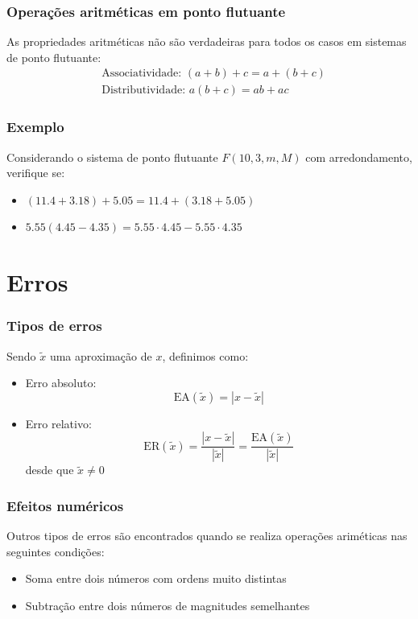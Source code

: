 \documentclass{beamer}
\begin{document}
\begin{frame}
	\frametitle{Operações aritméticas em ponto flutuante}
	As propriedades aritméticas não são verdadeiras para todos os casos em sistemas de ponto flutuante:
	\begin{equation*}
		\begin{aligned}
			&\mbox{Associatividade: } (a + b) + c = a + (b + c)\\
			&\mbox{Distributividade: } a (b + c) = ab + ac		
		\end{aligned}
	\end{equation*}
\end{frame}

\begin{frame}
	\frametitle{Exemplo}
	Considerando o sistema de ponto flutuante $ F(10, 3, m, M) $ com arredondamento, verifique se:
	\begin{itemize}
		\item $ (11.4 + 3.18) + 5.05 = 11.4 + (3.18 + 5.05) $
		\item $ 5.55(4.45 - 4.35) = 5.55\cdot 4.45 - 5.55\cdot4.35$
	\end{itemize}
\end{frame}

\section{Erros}

\begin{frame}
	\frametitle{Tipos de erros}
	Sendo $ \tilde{x} $ uma aproximação de $ x $, definimos como:
	\begin{itemize}
		\item Erro absoluto:
		\begin{equation*}
			\mbox{EA}(\tilde{x}) = |x - \tilde{x}|
		\end{equation*}
		\item Erro relativo:
		\begin{equation*}
			\mbox{ER}(\tilde{x}) = \frac{|x - \tilde{x}|}{|\tilde{x}|} = \frac{\mbox{EA}(\tilde{x})}{|\tilde{x}|}
		\end{equation*}
		desde que $ \tilde{x} \neq 0 $
	\end{itemize}
\end{frame}

\begin{frame}
	\frametitle{Efeitos numéricos}
	Outros tipos de erros são encontrados quando se realiza operações ariméticas nas seguintes condições:
	\begin{itemize}
	\item Soma entre dois números com ordens muito distintas
	\item Subtração entre dois números de magnitudes semelhantes
	\end{itemize}
\end{frame}
\end{document}
